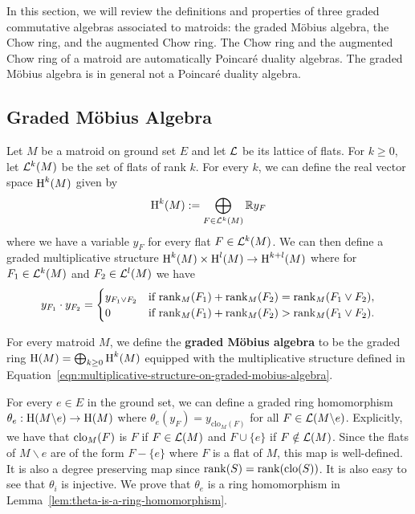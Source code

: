 \documentclass{puthesis-UG}
\begin{document}
In this section, we will review the definitions and properties of three graded commutative algebras associated to matroids: the graded M\"obius algebra, the Chow ring, and the augmented Chow ring. The Chow ring and the augmented Chow ring of a matroid are automatically Poincar\'e duality algebras. The graded M\"obius algebra is in general not a Poincar\'e duality algebra. 

\subsection{Graded M\"obius Algebra}

Let $M$ be a matroid on ground set $E$ and let $\mathcal{L}$ be its lattice of flats. For $k \geq 0$, let $\mathcal{L}^k(M)$ be the set of flats of rank $k$. For every $k$, we can define the real vector space $\operatorname{H}^k(M)$ given by 
\[
	\operatorname{H}^k(M) := \bigoplus_{F \in \mathcal{L}^k(M)} \mathbb{R} y_F
\]
where we have a variable $y_F$ for every flat $F \in \mathcal{L}^k(M)$. We can then define a graded multiplicative structure $\operatorname{H}^k(M) \times \operatorname{H}^l(M) \to \operatorname{H}^{k+l}(M)$ where for $F_1 \in \mathcal{L}^k(M)$ and $F_2 \in \mathcal{L}^l(M)$ we have 
\begin{equation}\label{eqn:multiplicative-structure-on-graded-mobius-algebra}
	y_{F_1} \cdot y_{F_2} = 
	\begin{cases}
		y_{F_1 \vee F_2} & \text{if $\operatorname{rank}_M(F_1) + \operatorname{rank}_M(F_2) = \operatorname{rank}_M(F_1 \vee F_2)$}, \\
		0 & \text{if $\operatorname{rank}_M(F_1) + \operatorname{rank}_M(F_2) > \operatorname{rank}_M(F_1 \vee F_2)$}.
	\end{cases} 
\end{equation}
\begin{defn}
	For every matroid $M$, we define the \textbf{graded M\"obius algebra} to be the graded ring $\operatorname{H}(M) = \bigoplus_{k \geq 0} \operatorname{H}^k(M)$ equipped with the multiplicative structure defined in Equation~\ref{eqn:multiplicative-structure-on-graded-mobius-algebra}. 
\end{defn}
For every $e \in E$ in the ground set, we can define a graded ring homomorphism $\theta_e : \operatorname{H}(M \backslash e) \to \operatorname{H}(M)$ where $\theta_e (y_F) = y_{\text{clo}_M(F)}$ for all $F \in \mathcal{L}(M \backslash e)$. Explicitly, we have that $\operatorname{clo}_M(F)$ is $F$ if $F \in \mathcal{L}(M)$ and $F \cup \{e\}$ if $F \notin \mathcal{L}(M)$. Since the flats of $M \backslash e$ are of the form $F - \{e\}$ where $F$ is a flat of $M$, this map is well-defined. It is also a degree preserving map since $\operatorname{rank} (S) = \operatorname{rank} (\operatorname{clo}(S))$. It is also easy to see that $\theta_i$ is injective. We prove that $\theta_e$ is a ring homomorphism in Lemma~\ref{lem:theta-is-a-ring-homomorphism}. 
\end{document}
